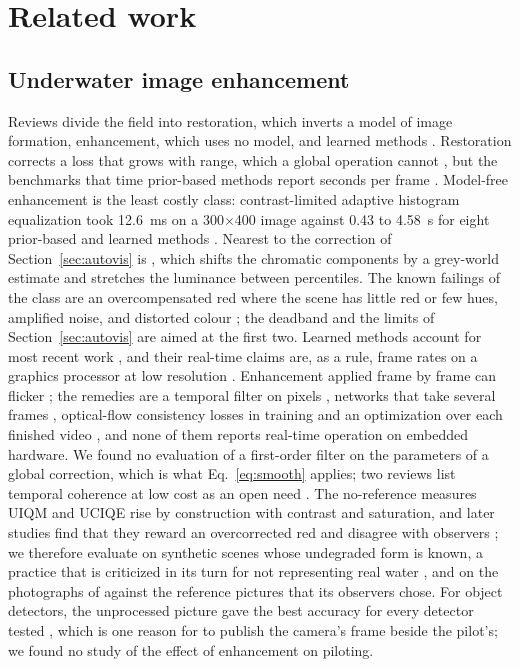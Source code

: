 \section{Related work}\label{sec:related}

\subsection{Underwater image enhancement}\label{sec:rw-enhancement}

Reviews divide the field into restoration, which inverts a model of image
formation, enhancement, which uses no model, and learned methods
\cite{schettini2010,wang2019review,lai2025,huang2026review}. Restoration
\cite{jaffe1990,akkaynak2018} corrects a loss that grows with range, which a
global operation cannot \cite{berman2020}, but the benchmarks that time
prior-based methods report seconds per frame
\cite{li2020uieb,peng2023,li2020uwcnn}. Model-free enhancement is the least
costly class: contrast-limited adaptive histogram equalization took 12.6~ms on a
300$\times$400 image against 0.43 to 4.58~s for eight prior-based and learned
methods \cite{liu2020ruie}. Nearest to the correction of
Section~\ref{sec:autovis} is \cite{bianco2015}, which shifts the chromatic
components by a grey-world estimate and stretches the luminance between
percentiles. The known failings of the class are an overcompensated red where
the scene has little red or few hues, amplified noise, and distorted colour
\cite{ancuti2012,ancuti2018,bianco2015,lai2025,wang2019review,liu2020ruie}; the
deadband and the limits of Section~\ref{sec:autovis} are aimed at the first two.
Learned methods account for most recent work \cite{cong2026}, and their
real-time claims are, as a rule, frame rates on a graphics processor at low
resolution \cite{islam2020,luo2026,zhu2026pic,yang2024lu2net}. Enhancement
applied frame by frame can flicker \cite{srinath2025,huang2026review}; the
remedies are a temporal filter on pixels \cite{ancuti2012}, networks that take
several frames \cite{du2024,xie2024}, optical-flow consistency losses in
training \cite{srinath2025} and an optimization over each finished video
\cite{zhu2025waterwave}, and none of them reports real-time operation on
embedded hardware. We found no evaluation of a first-order filter on the
parameters of a global correction, which is what Eq.~\eqref{eq:smooth} applies;
two reviews list temporal coherence at low cost as an open need
\cite{wang2019review,huang2026review}. The no-reference measures UIQM
\cite{panetta2016} and UCIQE \cite{yang2015} rise by construction with contrast
and saturation, and later studies find that they reward an overcorrected red and
disagree with observers \cite{li2020uieb,liu2020ruie,li2022limits,wang2019review};
we therefore evaluate on synthetic scenes whose undegraded form is known, a
practice that is criticized in its turn for not representing real water
\cite{berman2020}, and on the photographs of \cite{li2020uieb} against the
reference pictures that its observers chose. For object detectors, the unprocessed picture gave the best
accuracy for every detector tested \cite{wang2024detectors}, which is one reason
for \eeye{} to publish the camera's frame beside the pilot's; we found no study
of the effect of enhancement on piloting.

